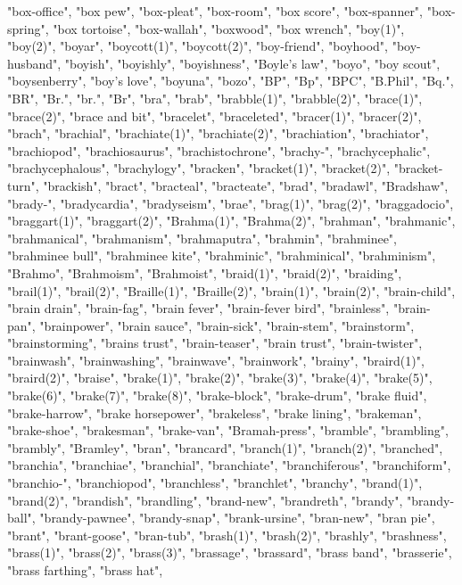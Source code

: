 "box-office",
"box pew",
"box-pleat",
"box-room",
"box score",
"box-spanner",
"box-spring",
"box tortoise",
"box-wallah",
"boxwood",
"box wrench",
"boy(1)",
"boy(2)",
"boyar",
"boycott(1)",
"boycott(2)",
"boy-friend",
"boyhood",
"boy-husband",
"boyish",
"boyishly",
"boyishness",
"Boyle's law",
"boyo",
"boy scout",
"boysenberry",
"boy's love",
"boyuna",
"bozo",
"BP",
"Bp",
"BPC",
"B.Phil",
"Bq.",
"BR",
"Br.",
"br.",
"Br",
"bra",
"brab",
"brabble(1)",
"brabble(2)",
"brace(1)",
"brace(2)",
"brace and bit",
"bracelet",
"braceleted",
"bracer(1)",
"bracer(2)",
"brach",
"brachial",
"brachiate(1)",
"brachiate(2)",
"brachiation",
"brachiator",
"brachiopod",
"brachiosaurus",
"brachistochrone",
"brachy-",
"brachycephalic",
"brachycephalous",
"brachylogy",
"bracken",
"bracket(1)",
"bracket(2)",
"bracket-turn",
"brackish",
"bract",
"bracteal",
"bracteate",
"brad",
"bradawl",
"Bradshaw",
"brady-",
"bradycardia",
"bradyseism",
"brae",
"brag(1)",
"brag(2)",
"braggadocio",
"braggart(1)",
"braggart(2)",
"Brahma(1)",
"Brahma(2)",
"brahman",
"brahmanic",
"brahmanical",
"brahmanism",
"brahmaputra",
"brahmin",
"brahminee",
"brahminee bull",
"brahminee kite",
"brahminic",
"brahminical",
"brahminism",
"Brahmo",
"Brahmoism",
"Brahmoist",
"braid(1)",
"braid(2)",
"braiding",
"brail(1)",
"brail(2)",
"Braille(1)",
"Braille(2)",
"brain(1)",
"brain(2)",
"brain-child",
"brain drain",
"brain-fag",
"brain fever",
"brain-fever bird",
"brainless",
"brain-pan",
"brainpower",
"brain sauce",
"brain-sick",
"brain-stem",
"brainstorm",
"brainstorming",
"brains trust",
"brain-teaser",
"brain trust",
"brain-twister",
"brainwash",
"brainwashing",
"brainwave",
"brainwork",
"brainy",
"braird(1)",
"braird(2)",
"braise",
"brake(1)",
"brake(2)",
"brake(3)",
"brake(4)",
"brake(5)",
"brake(6)",
"brake(7)",
"brake(8)",
"brake-block",
"brake-drum",
"brake fluid",
"brake-harrow",
"brake horsepower",
"brakeless",
"brake lining",
"brakeman",
"brake-shoe",
"brakesman",
"brake-van",
"Bramah-press",
"bramble",
"brambling",
"brambly",
"Bramley",
"bran",
"brancard",
"branch(1)",
"branch(2)",
"branched",
"branchia",
"branchiae",
"branchial",
"branchiate",
"branchiferous",
"branchiform",
"branchio-",
"branchiopod",
"branchless",
"branchlet",
"branchy",
"brand(1)",
"brand(2)",
"brandish",
"brandling",
"brand-new",
"brandreth",
"brandy",
"brandy-ball",
"brandy-pawnee",
"brandy-snap",
"brank-ursine",
"bran-new",
"bran pie",
"brant",
"brant-goose",
"bran-tub",
"brash(1)",
"brash(2)",
"brashly",
"brashness",
"brass(1)",
"brass(2)",
"brass(3)",
"brassage",
"brassard",
"brass band",
"brasserie",
"brass farthing",
"brass hat",
